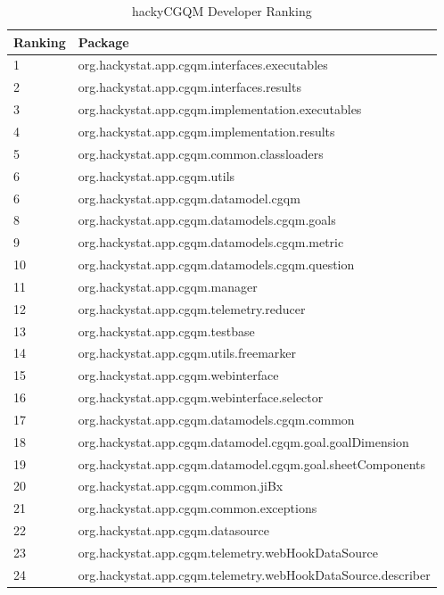 \begin{table}[!h]
  \begin{center}
    \caption{hackyCGQM Developer Ranking}
    \label{tab:hackyCGQM-developer-ranking}
    \begin{tabular}{|p{1.5cm}|p{11.5cm}|} \hline
{\bf Ranking} & {\bf Package} \\ \hline
1 & org.hackystat.app.cgqm.interfaces.executables \\ \hline
2 & org.hackystat.app.cgqm.interfaces.results \\ \hline
3 & org.hackystat.app.cgqm.implementation.executables \\ \hline
4 & org.hackystat.app.cgqm.implementation.results \\ \hline
5 & org.hackystat.app.cgqm.common.classloaders \\ \hline
6 & org.hackystat.app.cgqm.utils \\ \hline
6 & org.hackystat.app.cgqm.datamodel.cgqm\\ \hline
8 & org.hackystat.app.cgqm.datamodels.cgqm.goals \\ \hline
9 & org.hackystat.app.cgqm.datamodels.cgqm.metric \\ \hline
10 & org.hackystat.app.cgqm.datamodels.cgqm.question \\ \hline
11 & org.hackystat.app.cgqm.manager \\ \hline
12 & org.hackystat.app.cgqm.telemetry.reducer \\ \hline
13 & org.hackystat.app.cgqm.testbase \\ \hline
14 & org.hackystat.app.cgqm.utils.freemarker \\ \hline
15 & org.hackystat.app.cgqm.webinterface \\ \hline
16 & org.hackystat.app.cgqm.webinterface.selector \\ \hline
17 & org.hackystat.app.cgqm.datamodels.cgqm.common \\ \hline
18 & org.hackystat.app.cgqm.datamodel.cgqm.goal.goalDimension \\ \hline
19 & org.hackystat.app.cgqm.datamodel.cgqm.goal.sheetComponents \\ \hline
20 & org.hackystat.app.cgqm.common.jiBx \\ \hline
21 & org.hackystat.app.cgqm.common.exceptions \\ \hline
22 & org.hackystat.app.cgqm.datasource \\ \hline
23 & org.hackystat.app.cgqm.telemetry.webHookDataSource \\ \hline
24 & org.hackystat.app.cgqm.telemetry.webHookDataSource.describer \\ \hline
    \end{tabular}
  \end{center}
\end{table}

